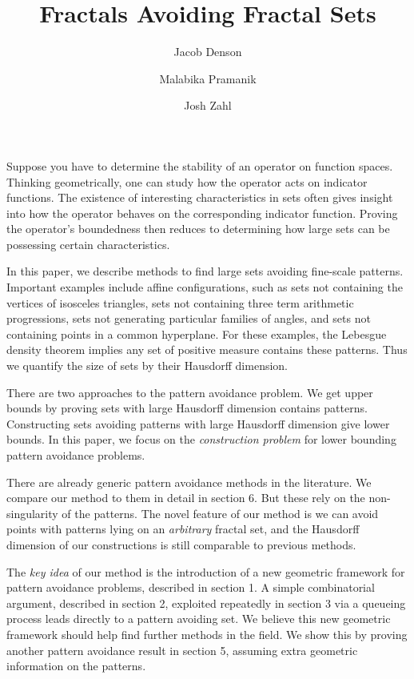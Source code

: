 \documentclass{article}
\title{Fractals Avoiding Fractal Sets}
\author{Jacob Denson\\ \and Malabika Pramanik\\ \and Josh Zahl}
\theoremstyle{plain}
\theoremstyle{plain}
\begin{document}
\maketitle

\begin{multicols}{2}

\begin{abstract}
	\blindtext[1]
\end{abstract}

Suppose you have to determine the stability of an operator on function spaces. Thinking geometrically, one can study how the operator acts on indicator functions. The existence of interesting characteristics in sets often gives insight into how the operator behaves on the corresponding indicator function. Proving the operator's boundedness then reduces to determining how large sets can be possessing certain characteristics.


In this paper, we describe methods to find large sets avoiding fine-scale patterns. Important examples include affine configurations, such as sets not containing the vertices of isosceles triangles, sets not containing three term arithmetic progressions, sets not generating particular families of angles, and sets not containing points in a common hyperplane. For these examples, the Lebesgue density theorem implies any set of positive measure contains these patterns. Thus we quantify the size of sets by their Hausdorff dimension.

There are two approaches to the pattern avoidance problem. We get upper bounds by proving sets with large Hausdorff dimension contains patterns. Constructing sets avoiding patterns with large Hausdorff dimension give lower bounds. In this paper, we focus on the {\it construction problem} for lower bounding pattern avoidance problems.

There are already generic pattern avoidance methods in the literature. We compare our method to them in detail in section 6. But these rely on the non-singularity of the patterns. The novel feature of our method is we can avoid points with patterns lying on an {\it arbitrary} fractal set, and the Hausdorff dimension of our constructions is still comparable to previous methods.

The {\it key idea} of our method is the introduction of a new geometric framework for pattern avoidance problems, described in section 1. A simple combinatorial argument, described in section 2, exploited repeatedly in section 3 via a queueing process leads directly to a pattern avoiding set. We believe this new geometric framework should help find further methods in the field. We show this by proving another pattern avoidance result in section 5, assuming extra geometric information on the patterns.


\end{multicols}
\end{document}
